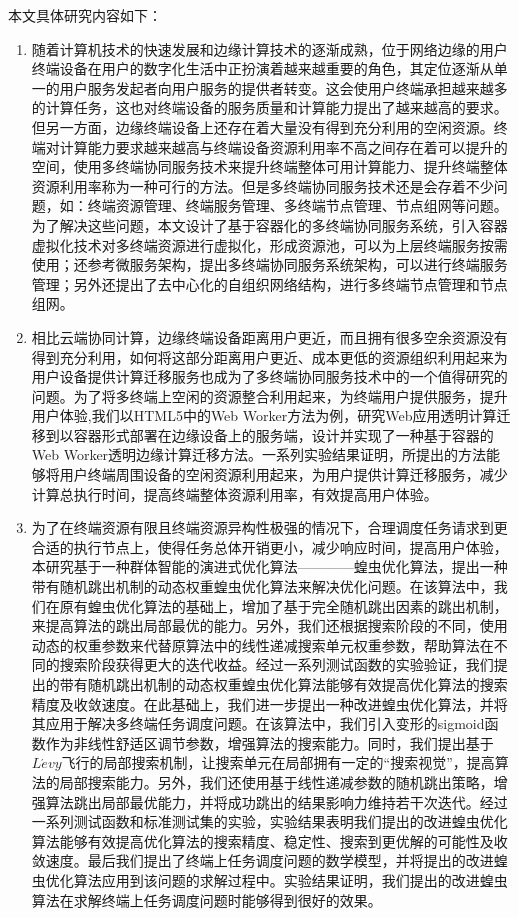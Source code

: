 本文具体研究内容如下：
\begin{enumerate}
    \item 随着计算机技术的快速发展和边缘计算技术的逐渐成熟，位于网络边缘的用户终端设备在用户的数字化生活中正扮演着越来越重要的角色，其定位逐渐从单一的用户服务发起者向用户服务的提供者转变。这会使用户终端承担越来越多的计算任务，这也对终端设备的服务质量和计算能力提出了越来越高的要求。但另一方面，边缘终端设备上还存在着大量没有得到充分利用的空闲资源。终端对计算能力要求越来越高与终端设备资源利用率不高之间存在着可以提升的空间，使用多终端协同服务技术来提升终端整体可用计算能力、提升终端整体资源利用率称为一种可行的方法。但是多终端协同服务技术还是会存着不少问题，如：终端资源管理、终端服务管理、多终端节点管理、节点组网等问题。为了解决这些问题，本文设计了基于容器化的多终端协同服务系统，引入容器虚拟化技术对多终端资源进行虚拟化，形成资源池，可以为上层终端服务按需使用；还参考微服务架构，提出多终端协同服务系统架构，可以进行终端服务管理；另外还提出了去中心化的自组织网络结构，进行多终端节点管理和节点组网。
    \item 相比云端协同计算，边缘终端设备距离用户更近，而且拥有很多空余资源没有得到充分利用，如何将这部分距离用户更近、成本更低的资源组织利用起来为用户设备提供计算迁移服务也成为了多终端协同服务技术中的一个值得研究的问题。为了将多终端上空闲的资源整合利用起来，为终端用户提供服务，提升用户体验,我们以HTML5中的Web Worker方法为例，研究Web应用透明计算迁移到以容器形式部署在边缘设备上的服务端，设计并实现了一种基于容器的Web Worker透明边缘计算迁移方法。一系列实验结果证明，所提出的方法能够将用户终端周围设备的空闲资源利用起来，为用户提供计算迁移服务，减少计算总执行时间，提高终端整体资源利用率，有效提高用户体验。
    \item 为了在终端资源有限且终端资源异构性极强的情况下，合理调度任务请求到更合适的执行节点上，使得任务总体开销更小，减少响应时间，提高用户体验，本研究基于一种群体智能的演进式优化算法————蝗虫优化算法，提出一种带有随机跳出机制的动态权重蝗虫优化算法来解决优化问题。在该算法中，我们在原有蝗虫优化算法的基础上，增加了基于完全随机跳出因素的跳出机制，来提高算法的跳出局部最优的能力。另外，我们还根据搜索阶段的不同，使用动态的权重参数来代替原算法中的线性递减搜索单元权重参数，帮助算法在不同的搜索阶段获得更大的迭代收益。经过一系列测试函数的实验验证，我们提出的带有随机跳出机制的动态权重蝗虫优化算法能够有效提高优化算法的搜索精度及收敛速度。在此基础上，我们进一步提出一种改进蝗虫优化算法，并将其应用于解决多终端任务调度问题。在该算法中，我们引入变形的sigmoid函数作为非线性舒适区调节参数，增强算法的搜索能力。同时，我们提出基于$L\acute{e}vy$飞行的局部搜索机制，让搜索单元在局部拥有一定的“搜索视觉”，提高算法的局部搜索能力。另外，我们还使用基于线性递减参数的随机跳出策略，增强算法跳出局部最优能力，并将成功跳出的结果影响力维持若干次迭代。经过一系列测试函数和标准测试集的实验，实验结果表明我们提出的改进蝗虫优化算法能够有效提高优化算法的搜索精度、稳定性、搜索到更优解的可能性及收敛速度。最后我们提出了终端上任务调度问题的数学模型，并将提出的改进蝗虫优化算法应用到该问题的求解过程中。实验结果证明，我们提出的改进蝗虫算法在求解终端上任务调度问题时能够得到很好的效果。

\end{enumerate}
